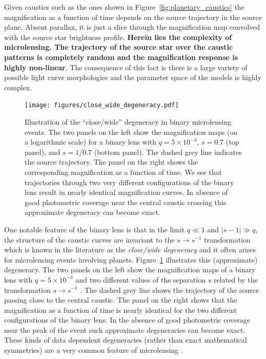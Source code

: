 \documentclass[12pt]{report}
\begin{document}
Given caustics such as the ones shown in Figure~\ref{fig:planetary_caustics}
the magnification as a function of time depends on the source trajectory in the
source plane. Absent parallax, it is just a slice through the magnification map
convolved with the source star brightness profile. \textbf{Herein lies the
    complexity of microlensing. The trajectory of the source star over the caustic
    patterns is completely random and the magnification response is highly
    non-linear}. The consequence of this fact is there is a large variety of
possible light curve morphologies and the parameter space of the models is
highly complex.

\begin{figure}[t]
    \centering
    \texttt{[image: figures/close\_wide\_degeneracy.pdf]}
    \caption{Illustration of the ``close/wide'' degeneracy in binary microlensing events.
        The two panels on the left show the magnification maps (on a logarithmic scale) for
        a binary lens with $q=5\times 10^{-3}$, $s=0.7$ (top panel), and $s=1/0.7$
        (bottom panel). The dashed grey line indicates the source trajectory. The panel
        on the right shows the corresponding magnification as a function of time.
        We see that trajectories through two very different configurations of the binary lens
        result in nearly identical magnification curves. In absence of good
        photometric coverage near the central caustic crossing this approximate degeneracy
        can become exact.}
    \label{fig:close_wide_degeneracy}
\end{figure}

One notable feature of the binary lens is that in the limit $q\ll 1$ and
$\lvert s-1\rvert \gg q$, the structure of the caustic curves are invariant to
the $s\rightarrow s^{-1}$ transformation \citet{dominik1999} which is known in
the literature as the \emph{close/wide degeneracy} and it often arises for
microlensing events involving planets. Figure~\ref{fig:close_wide_degeneracy}
illustrates this (approximate) degeneracy. The two panels on the left show the
magnification maps of a binary lens with $q=5\times 10^{-3}$ and two different
values of the separation $s$ related by the transformation $s\rightarrow
    s^{-1}$ . The dashed grey line shows the trajectory of the source passing close
to the central caustic. The panel on the right shows that the magnification as
a function of time is nearly identical for the two different configurations of
the binary lens. In the absence of good photometric coverage near the peak of
the event such approximate degeneracies can become exact. These kinds of data
dependent degeneracies (rather than exact mathematical symmetries) are a very
common feature of microlensing \citep{erdl1993}.
\end{document}
